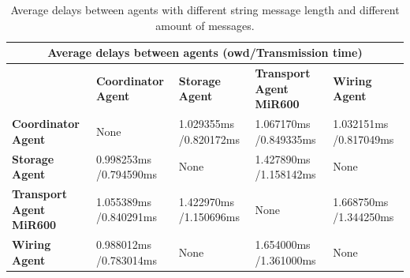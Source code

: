 \begin{table}[b]
    \small
    \centering
    \caption{Average delays between agents with different string message length and 
    different amount of messages.}
    \label{tab: mean-usecase-time}
    \begin{tabular}{|m{}|m{}|m{}|m{}|m{}|}
    \hline
    \multicolumn{5}{|c|}{\textbf{Average delays between agents (\gls{owd}/Transmission time)}}                                                            \\ \hline
    \textbf{}                         & \textbf{Coordinator Agent}             & \textbf{Storage Agent}        & \textbf{Transport Agent MiR600}    & \textbf{Wiring Agent}\\ \hline
    \textbf{Coordinator Agent}      & None                  & 1.029355ms /0.820172ms & 1.067170ms /0.849335ms  & 1.032151ms /0.817049ms \\ \hline
    \textbf{Storage Agent}          & 0.998253ms /0.794590ms & None                  & 1.427890ms /1.158142ms  & None                  \\ \hline
    \textbf{Transport Agent MiR600} & 1.055389ms /0.840291ms & 1.422970ms /1.150696ms & None                   & 1.668750ms /1.344250ms \\ \hline
    \textbf{Wiring Agent}           & 0.988012ms /0.783014ms & None                  & 1.654000ms /1.361000ms  & None                  \\ \hline
    \end{tabular}
\end{table}



